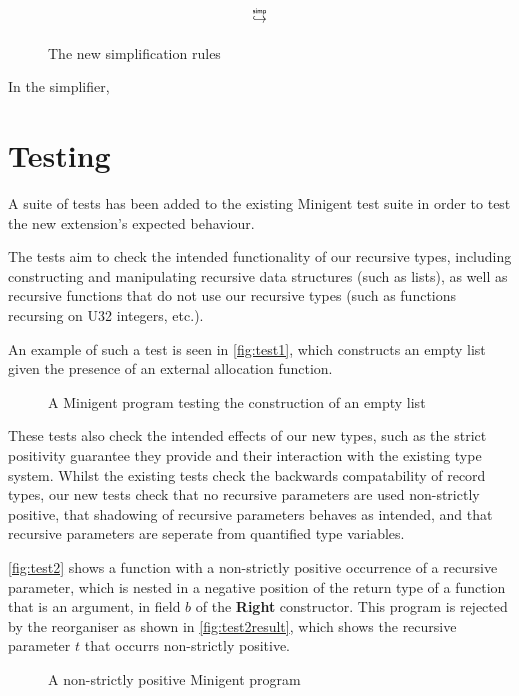 \begin{figure}
    \centering
    $$
        \simp
    $$
    \caption{The new simplification rules}
    \label{fig:simprules}
\end{figure}

In the simplifier, 

\section{Testing}

A suite of tests has been added to the existing Minigent test suite in order to test the new extension's 
expected behaviour.

The tests aim to check the intended functionality of our recursive types, including constructing and manipulating
recursive data structures (such as lists), as well as recursive functions that do not use our recursive types 
(such as functions recursing on U32 integers, etc.).

An example of such a test is seen in \autoref{fig:test1}, which constructs an empty list given the presence
of an external allocation function.

\begin{figure}
    \centering
    
    \caption{A Minigent program testing the construction of an empty list}
    \label{fig:test1}
\end{figure}

These tests also check the intended effects of our new types, such as the strict positivity guarantee they provide
and their interaction with the existing type system. Whilst the existing tests check the backwards compatability of
record types, our new tests check that no recursive parameters are used non-strictly positive, that shadowing of recursive
parameters behaves as intended, and that recursive parameters are seperate from quantified type variables.

\autoref{fig:test2} shows a function with a non-strictly positive occurrence of a recursive parameter, which is nested in 
a negative position of the return type of a function that is an argument, in field $b$ of the \textbf{Right} constructor.
This program is rejected by the reorganiser
as shown in \autoref{fig:test2result}, which shows the recursive parameter $t$ that occurrs non-strictly positive.

\begin{figure}
    \centering
    
    \caption{A non-strictly positive Minigent program}
    \label{fig:test2}
\end{figure}

